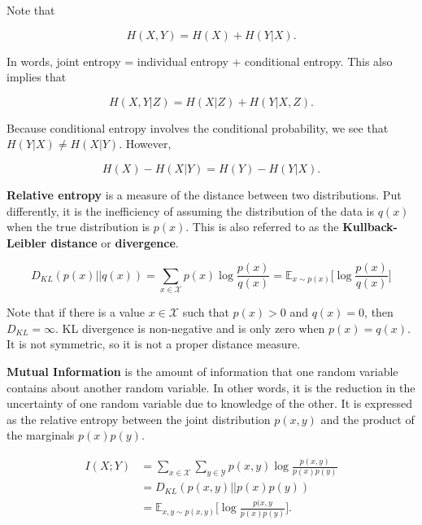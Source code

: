 \noindent Note that

\begin{equation}
	H(X, Y) = H(X) + H(Y | X).
\end{equation}

\noindent In words, joint entropy = individual entropy + conditional entropy. This also implies that

\begin{equation}
	H(X, Y | Z) = H(X | Z) + H(Y | X, Z).
\end{equation}

\noindent Because conditional entropy involves the conditional probability, we see that $H(Y | X) \neq H(X | Y)$. However,

\begin{equation}
	H(X) - H(X | Y) = H(Y) - H(Y | X).
\end{equation}

\textbf{Relative entropy} is a measure of the distance between two distributions. Put differently, it is the inefficiency of assuming the distribution of the data is $q(x)$ when the true distribution is $p(x)$. This is also referred to as the \textbf{Kullback-Leibler distance} or \textbf{divergence}.

\begin{equation}
	D_{KL} (p(x) || q(x)) = \sum_{x \in \mathcal{X}} p(x) \log \frac{p(x)}{q(x)} = \mathbb{E}_{x \sim p(x)} \Big[ \log \frac{p(x)}{q(x)} \Big]
	\label{eq: KL_definition}
\end{equation}

\noindent Note that if there is a value $x \in \mathcal{X}$ such that $p(x) > 0$ and $q(x) = 0$, then $D_{KL} = \infty$. KL divergence is non-negative and is only zero when $p(x) = q(x)$. It is not symmetric, so it is not a proper distance measure.

\textbf{Mutual Information} is the amount of information that one random variable contains about another random variable. In other words, it is the reduction in the uncertainty of one random variable due to knowledge of the other. It is expressed as the relative entropy between the joint distribution $p(x, y)$ and the product of the marginals $p(x) p(y)$.

\begin{align*}
	I(X; Y) &= \sum_{x \in \mathcal{X}} \sum_{y \in \mathcal{Y}} p(x, y) \log \frac{p(x, y)}{p(x) p(y)} \\
	           &= D_{KL} (p(x, y) || p(x) p(y)) \\
	           &= \mathbb{E}_{x, y \sim p(x, y)} \Big[ \log \frac{p(x, y}{p(x) p(y)} \Big].
\end{align*}

